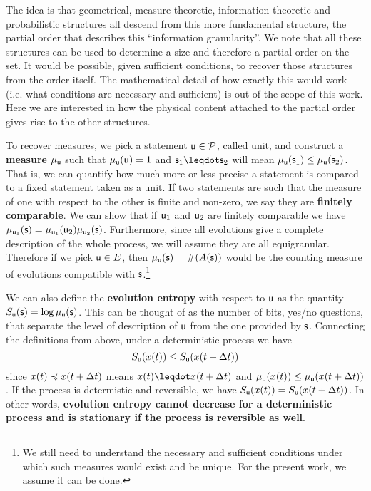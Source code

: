 \documentclass[letterpaper]{article}
\begin{document}
The idea is that geometrical, measure theoretic, information theoretic and probabilistic structures all descend from this more fundamental structure, the partial order that describes this ``information granularity''. We note that all these structures can be used to determine a size and therefore a partial order on the set. It would be possible, given sufficient conditions, to recover those structures from the order itself. The mathematical detail of how exactly this would work (i.e. what conditions are necessary and sufficient) is out of the scope of this work. Here we are interested in how the physical content attached to the partial order gives rise to the other structures.

To recover measures, we pick a statement $\stmt[u] \in \tdomain[P]$, called unit, and construct a \textbf{measure} $\mu_{\stmt[u]}$ such that $\mu_{\stmt[u]}(\stmt[u]) = 1$ and $\stmt_1 \finer \stmt_2$ will mean $\mu_{\stmt[u]}(\stmt_1) \leq \mu_{\stmt[u]}(\stmt_2)$. That is, we can quantify how much more or less precise a statement is compared to a fixed statement taken as a unit. If two statements are such that the measure of one with respect to the other is finite and non-zero, we say they are \textbf{finitely comparable}. We can show that if $\stmt[u]_1$ and $\stmt[u]_2$ are finitely comparable we have $ \mu_{\stmt[u]_1}(\stmt) = \mu_{\stmt[u]_1}(\stmt[u]_2) \mu_{\stmt[u]_2}(\stmt)$. Furthermore, since all evolutions give a complete description of the whole process, we will assume they are all equigranular. Therefore if we pick $\stmt[u] \in E$, then $\mu_{\stmt[u]}(\stmt)=\#(A(\stmt))$ would be the counting measure of evolutions compatible with $\stmt$.\footnote{We still need to understand the necessary and sufficient conditions under which such measures would exist and be unique. For the present work, we assume it can be done.}

We can also define the \textbf{evolution entropy} with respect to $\stmt[u]$ as the quantity $S_{\stmt[u]}(\stmt) = \log \mu_{\stmt[u]}(\stmt)$. This can be thought of as the number of bits, yes/no questions, that separate the level of description of $\stmt[u]$ from the one provided by $\stmt$. Connecting the definitions from above, under a deterministic process we have
\begin{equation}\label{entropy_increases}
S_{\stmt[u]}(x(t)) \leq S_{\stmt[u]}(x(t + \Delta t))
\end{equation}
since $x(t)\narrower x(t+\Delta t)$ means $x(t) \finer x(t+\Delta t)$ and $\mu_{\stmt[u]}(x(t)) \leq \mu_{\stmt[u]}(x(t+\Delta t))$. If the process is determistic and reversible, we have $S_{\stmt[u]}(x(t)) = S_{\stmt[u]}(x(t + \Delta t))$. In other words, \textbf{evolution entropy cannot decrease for a deterministic process and is stationary if the process is reversible as well}.
\end{document}
